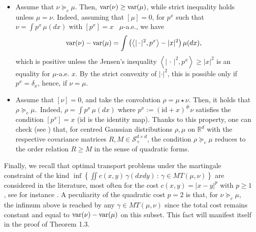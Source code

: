 \documentclass[11pt,letterpaper,reqno]{amsart}
\theoremstyle{definition}
\numberwithin{equation}{section}
\def\f{\varphi}
\newcommand{\R}{\mathbb{R}}
\newcommand{\Rd}{\R^d}
\newcommand{\ident}{{\mathrm{id}}}
\newcommand{\var}{{\rm{var}}}
\newcommand{\argu}{{\,\cdot\,}}
\newcommand{\Sddp}{{\mathcal{S}^{d\times d}_+}}
\newcommand{\pairing}[1]{{\left \langle #1 \right \rangle}}
\DeclareMathOperator{\spt}{sp}
\begin{document}
 \begin{itemize}
 
 \item [(p1)] Assume that $\nu  \succeq_c \mu$. Then, $  \var(\nu)\ge \var(\mu)$, while  
strict inequality holds unless $\mu=\nu.$
Indeed, assuming that $[\mu]=0$, for $p^x$ such that $\nu= \int p^x \, \mu(dx)$ with $[p^x]=x$ \ $\mu$-a.e.,
 we have
 $$  \var(\nu) -\var(\mu)=  \int \big( \pairing{|\argu|^2,p^x} - |x|^2\big)\, \mu(dx),$$
 which is positive unless the Jensen's inequality $ \pairing{|\argu|^2,p^x} \ge |x|^2$ is an equality for $\mu$-a.e. $x$.  By the strict convexity of $|\cdot|^2$, this  is possible only if $p^x =\delta_x$, hence, if $\nu=\mu$.

 \item [(p2)] Assume that $[\nu]=0$, and take the convolution $\rho=\mu\star \nu$. Then, it holds that   $ \rho  \succeq_c \mu .$\
Indeed,  $\rho= \int p^x \, \mu(dx)$ where $p^x := (\ident+x)^\# \nu$ satisfies the condition $[p^x]=x$ ($\mathrm{id}$ is the identity map).
Thanks to this  property, one can check (see \cite{muller2001stochastic}) that, for centred Gaussian distributions $\rho,\mu$ on $\Rd$ with the respective covariance matrices  $R, M \in \Sddp $, the condition $\rho\succeq_c \mu$ reduces to the order relation $ R \geq M$ in the sense of quadratic forms.   

\end{itemize}

Finally, we {recall} that optimal transport  problems under the martingale constraint of the kind
$ \inf\left\{ \iint c(x,y) \, \gamma(dxdy)\, :\, \gamma\in MT(\mu,\nu)\right\} $
 are  considered  in the literature, most often for the cost $c(x,y) =|x-y|^p$ with $p\ge1$, see for instance \cite{ABC,beiglbock2013,Wiesel2023,gozlan,Ghoussoub}.
 A peculiarity of the quadratic cost $p=2$  is 
that, for $\nu  \succeq_c \mu$,   the infimum above is reached by any $\gamma\in MT(\mu,\nu)$
since the total cost remains constant and equal to $\var(\nu)-\var(\mu)$ on this subset. This fact will manifest itself in the proof of Theorem 1.3.
  
\end{document}
